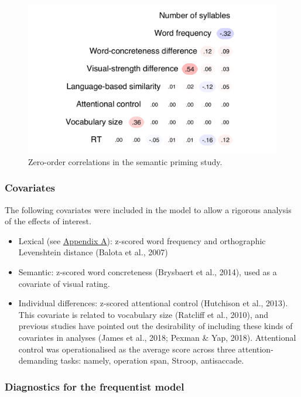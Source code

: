 \documentclass[
  12pt,
  man,floatsintext]{apa7}
\begin{document}
\begin{figure}

{\centering \includegraphics[width=0.65\linewidth]{manuscript_files/figure-latex/semanticpriming-correlations-1} 

}

\caption{Zero-order correlations in the semantic priming study.}\label{fig:semanticpriming-correlations}
\end{figure}

\hypertarget{covariates}{%
\subsubsection{Covariates}\label{covariates}}

The following covariates were included in the model to allow a rigorous analysis of the effects of interest.

\begin{itemize}
\item
  Lexical (see \protect\hyperlink{appendix-A-lexical-covariates}{\underline{Appendix A}}): z-scored word frequency and orthographic Levenshtein distance (Balota et al., 2007)
\item
  Semantic: z-scored word concreteness (Brysbaert et al., 2014), used as a covariate of visual rating.
\item
  Individual differences: z-scored attentional control (Hutchison et al., 2013). This covariate is related to vocabulary size (Ratcliff et al., 2010), and previous studies have pointed out the desirability of including these kinds of covariates in analyses (James et al., 2018; Pexman \& Yap, 2018). Attentional control was operationalised as the average score across three attention-demanding tasks: namely, operation span, Stroop, antisaccade.
\end{itemize}

\hypertarget{diagnostics-for-the-frequentist-model}{%
\subsubsection{Diagnostics for the frequentist model}\label{diagnostics-for-the-frequentist-model}}
\end{document}
